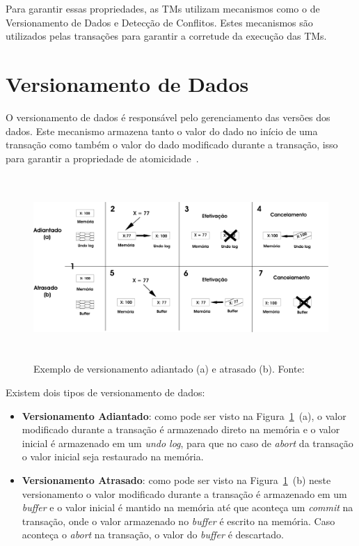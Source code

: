 \documentclass[diss,capa]{texufpel}
\begin{document}
Para garantir essas propriedades, as TMs utilizam mecanismos como o de Versionamento de Dados e Detecção de Conflitos. Estes mecanismos são utilizados pelas transações para garantir a corretude da execução das TMs.

\section{Versionamento de Dados}

O versionamento de dados é responsável pelo gerenciamento das versões dos dados. Este mecanismo armazena tanto o valor do dado no início de uma transação como também o valor do dado modificado durante a transação, isso para garantir a propriedade de atomicidade~\cite{BaldassinTese2009}.

\begin{figure}[!htp]
\centering
\includegraphics[height=7cm]{images/versionamento.png}
\caption{Exemplo de versionamento adiantado (a) e atrasado (b). Fonte:~\cite{BaldassinTese2009}}
\label{figuraversionamento}
\end{figure}

Existem dois tipos de versionamento de dados:

\begin{itemize}
\item \textbf{Versionamento Adiantado}: como pode ser visto na Figura~\ref{figuraversionamento}~(a), o valor modificado durante a transação é armazenado direto na memória e o valor inicial é armazenado em um \emph{undo log}, para que no caso de \emph{abort} da transação o valor inicial seja restaurado na memória.

\item \textbf{Versionamento Atrasado}: como pode ser visto na Figura~\ref{figuraversionamento}~(b) neste versionamento o valor modificado durante a transação é armazenado em um \emph{buffer} e o valor inicial é mantido na memória até que aconteça um \emph{commit} na transação, onde o valor armazenado no \emph{buffer} é escrito na memória. Caso aconteça o \emph{abort} na transação, o valor do \emph{buffer} é descartado.
\end{itemize}
\end{document}
